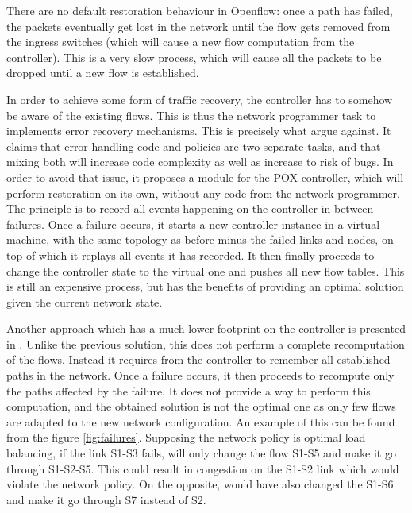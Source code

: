 \documentclass[]{IEEEtran}
\begin{document}
There are no default restoration behaviour in Openflow: once a path has failed, the packets eventually get lost in the network until the flow gets removed from the ingress switches (which will cause a new flow computation from the controller). This is a very slow process, which will cause all the packets to be dropped until a new flow is established.

In order to achieve some form of traffic recovery, the controller has to somehow be aware of the existing flows. This is thus the network programmer task to implements error recovery mechanisms. This is precisely what \cite{Kuzniar:2013:AFR:2491185.2491218} argue against. It claims that error handling code and policies are two separate tasks, and that mixing both will increase code complexity as well as increase to risk of bugs. In order to avoid that issue, it proposes a module for the POX controller, which will perform restoration on its own, without any code from the network programmer. The principle is to record all events happening on the controller in-between failures. Once a failure occurs, it starts a new controller instance in a virtual machine, with the same topology as before minus the failed links and nodes, on top of which it replays all events it has recorded. It then finally proceeds to change the controller state to the virtual one and pushes all new flow tables. This is still an expensive process, but has the benefits of providing an optimal solution given the current network state.

Another approach which has a much lower footprint on the controller is presented in \cite{2911632}. Unlike the previous solution, this does not perform a complete recomputation of the flows. Instead it requires from the controller to remember all established paths in the network. Once a failure occurs, it then proceeds to recompute only the paths affected by the failure. It does not provide a way to perform this computation, and the obtained solution is not the optimal one as only few flows are adapted to the new network configuration. An example of this can be found from the figure \ref{fig:failures}. Supposing the network policy is optimal load balancing, if the link S1-S3 fails, \cite{2911632} will only change the flow S1-S5 and make it go through S1-S2-S5. This could result in congestion on the S1-S2 link which would violate the network policy. On the opposite, \cite{Kuzniar:2013:AFR:2491185.2491218} would have also changed the S1-S6 and make it go through S7 instead of S2.
\end{document}
